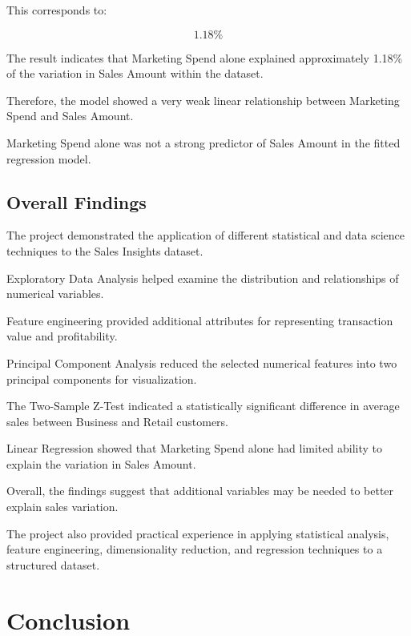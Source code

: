 \documentclass[12pt,a4paper]{report}
\begin{document}
This corresponds to:

\[
1.18\%
\]

The result indicates that
Marketing Spend alone explained
approximately 1.18\% of the
variation in Sales Amount
within the dataset.

Therefore, the model showed
a very weak linear relationship
between Marketing Spend and
Sales Amount.

Marketing Spend alone was
not a strong predictor of
Sales Amount in the
fitted regression model.


\section{Overall Findings}

The project demonstrated the
application of different
statistical and data science
techniques to the Sales
Insights dataset.

Exploratory Data Analysis
helped examine the distribution
and relationships of
numerical variables.

Feature engineering provided
additional attributes for
representing transaction
value and profitability.

Principal Component Analysis
reduced the selected numerical
features into two principal
components for visualization.

The Two-Sample Z-Test indicated
a statistically significant
difference in average sales
between Business and
Retail customers.

Linear Regression showed
that Marketing Spend alone
had limited ability to
explain the variation
in Sales Amount.

Overall, the findings suggest
that additional variables
may be needed to better
explain sales variation.

The project also provided
practical experience in
applying statistical analysis,
feature engineering,
dimensionality reduction,
and regression techniques
to a structured dataset.

\endgroup



\chapter{Conclusion}
\end{document}

